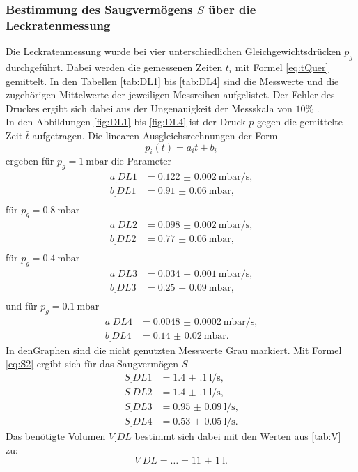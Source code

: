 \subsubsection{Bestimmung des Saugvermögens $S$ über die Leckratenmessung}

Die Leckratenmessung wurde bei vier unterschiedlichen Gleichgewichtsdrücken $p_g$ durchgeführt. Dabei werden die gemessenen Zeiten $t_i$ mit Formel \eqref{eq:tQuer} gemittelt.
In den Tabellen \ref{tab:DL1} bis \ref{tab:DL4} sind die Messwerte und die zugehörigen Mittelwerte der jeweiligen Messreihen aufgelistet. Der Fehler des Druckes ergibt sich dabei aus der Ungenauigkeit der Messskala von $10\%$ \cite{V70}.\\
In den Abbildungen \ref{fig:DL1} bis \ref{fig:DL4} ist der Druck $p$ gegen die gemittelte Zeit $\bar{t}$ aufgetragen.
Die linearen Ausgleichsrechnungen der Form
\[
p_i(t) = a_it+b_i
\]
ergeben für $p_g = \SI{1}{\milli\bar}$ die Parameter
\begin{align*}
a_.{DL1} &= \SI{0.122(2)}{\milli\bar\per\second} \text{,}\\
b_.{DL1} &= \SI{0.91(6)}{\milli\bar} \text{,}\\
\end{align*}
für $p_g = \SI{0.8}{\milli\bar}$
\begin{align*}
a_.{DL2} &= \SI{0.098(2)}{\milli\bar\per\second} \text{,}\\
b_.{DL2} &= \SI{0.77(6)}{\milli\bar} \text{,}\\
\end{align*}
für $p_g = \SI{0.4}{\milli\bar}$
\begin{align*}
a_.{DL3} &= \SI{0.034(1)}{\milli\bar\per\second} \text{,}\\
b_.{DL3} &= \SI{0.25(9)}{\milli\bar} \text{,}\\
\end{align*}
und für $p_g = \SI{0.1}{\milli\bar}$
\begin{align*}
a_.{DL4} &= \SI{0.0048(2)}{\milli\bar\per\second} \text{,}\\
b_.{DL4} &= \SI{0.14(2)}{\milli\bar} \text{.}
\end{align*}
In denGraphen sind die nicht genutzten Messwerte Grau markiert.
Mit Formel \eqref{eq:S2} ergibt sich für das Saugvermögen $S$
\begin{align*}
S_.{DL1} &= \SI{1.4(1)}{\litre\per\second} \text{,}\\
S_.{DL2} &= \SI{1.4(1)}{\litre\per\second} \text{,}\\
S_.{DL3} &= \SI{0.95(9)}{\litre\per\second} \text{,}\\
S_.{DL4}   &= \SI{0.53(5)}{\litre\per\second} \text{.}
\end{align*}
Das benötigte Volumen $V_.{DL}$ bestimmt sich dabei mit den Werten aus \ref{tab:V} zu:
\[
V_.{DL} = \dots = \SI{11(1)}{\litre}\text{.}
\]


